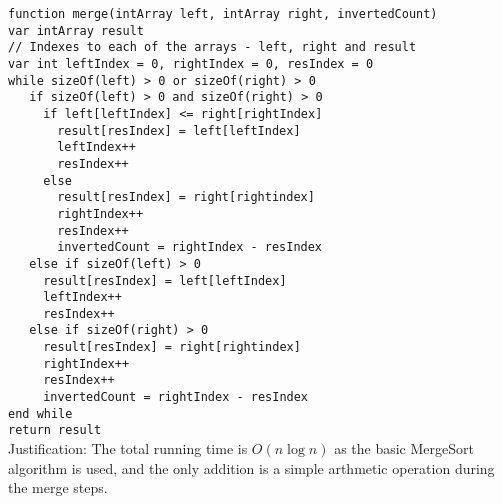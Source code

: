 \documentclass{article}
\begin{document}
\vspace{0.5cm} \texttt{function merge(intArray left, intArray right,
invertedCount)}\\
\texttt{var intArray result}\\
\texttt{// Indexes to each of the arrays - left, right and result}\\
\texttt{var int leftIndex = 0, rightIndex = 0, resIndex = 0}\\
\texttt{while sizeOf(left) > 0 or sizeOf(right) > 0}\\
\texttt{$\quad$ if sizeOf(left) > 0 and sizeOf(right) > 0}\\
\texttt{$\quad\quad$ if left[leftIndex] <= right[rightIndex]}\\
\texttt{$\quad\quad\quad$ result[resIndex] = left[leftIndex]}\\
\texttt{$\quad\quad\quad$ leftIndex++}\\
\texttt{$\quad\quad\quad$ resIndex++}\\
\texttt{$\quad\quad$ else}\\
\texttt{$\quad\quad\quad$ result[resIndex] = right[rightindex]}\\
\texttt{$\quad\quad\quad$ rightIndex++}\\
\texttt{$\quad\quad\quad$ resIndex++}\\
\texttt{$\quad\quad\quad$ invertedCount = rightIndex - resIndex}\\
\texttt{$\quad$ else if sizeOf(left) > 0}\\
\texttt{$\quad\quad$ result[resIndex] = left[leftIndex]}\\
\texttt{$\quad\quad$ leftIndex++}\\
\texttt{$\quad\quad$ resIndex++}\\
\texttt{$\quad$ else if sizeOf(right) > 0}\\
\texttt{$\quad\quad$ result[resIndex] = right[rightindex]}\\
\texttt{$\quad\quad$ rightIndex++}\\
\texttt{$\quad\quad$ resIndex++}\\
\texttt{$\quad\quad$ invertedCount = rightIndex - resIndex}\\
\texttt{end while}\\
\texttt{return result}\\

Justification: The total running time is $O(n\log n)$ as the basic MergeSort
algorithm is used, and the only addition is a simple arthmetic operation during
the merge steps.
\end{document}
